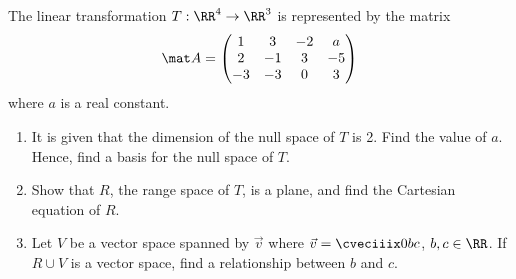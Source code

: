 \begin{problem}
    The linear transformation $T : \RR^4 \to \RR^3$ is represented by the matrix \[\mat A = \begin{pmatrix}1 & 3 & -2 & a \\ 2 & -1 & 3 & -5 \\ -3 & -3 & 0 & 3\end{pmatrix}\] where $a$ is a real constant.

    \begin{enumerate}
        \item It is given that the dimension of the null space of $T$ is 2. Find the value of $a$. Hence, find a basis for the null space of $T$.
        \item Show that $R$, the range space of $T$, is a plane, and find the Cartesian equation of $R$.
        \item Let $V$ be a vector space spanned by $\vec v$ where $\vec v = \cveciiix0bc$, $b, c \in \RR$. If $R \cup V$ is a vector space, find a relationship between $b$ and $c$.
    \end{enumerate}
\end{problem}
\clearpage

